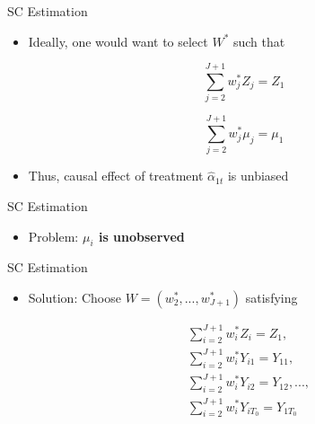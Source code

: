 \documentclass[dvipsnames,hyperref={pdfpagelabels=false}]{beamer}
\begin{document}
\begin{frame}{SC Estimation}
\begin{itemize}

\item Ideally, one would want to select $W^{*}$ such that

\begin{equation*}
\sum^{J+1}_{j=2}w^*_{j}Z_{j} = Z_{1}  
\end{equation*}

\begin{equation*}
\sum^{J+1}_{j=2}w^*_{j}\mu_{j} = \mu_{1}  
\end{equation*}

\item Thus, causal effect of treatment $\hat{\alpha}_{1t}$ is unbiased 	

\end{itemize}
\end{frame}







\begin{frame}{SC Estimation}
\begin{itemize}
	
	\item Problem: \textbf{$\mu_{i}$ is unobserved}
\end{itemize}
\end{frame}





\begin{frame}{SC Estimation}
\begin{itemize}

\item Solution: Choose $W=(w^{*}_{2},...,w^{*}_{J+1})$ satisfying

\begin{equation*}
\begin{aligned}
&\sum^{J+1}_{i=2}w^*_{i}Z_{i} = Z_{1}, \\ 
&\sum^{J+1}_{i=2}w^*_{i}Y_{i1} = Y_{11},  \\
&\sum^{J+1}_{i=2}w^*_{i}Y_{i2} = Y_{12},...,  \\
&\sum^{J+1}_{i=2}w^*_{i}Y_{iT_{0}} = Y_{1T_{0}}    
\end{aligned}
\end{equation*}

\end{itemize}
\end{frame}
\end{document}
